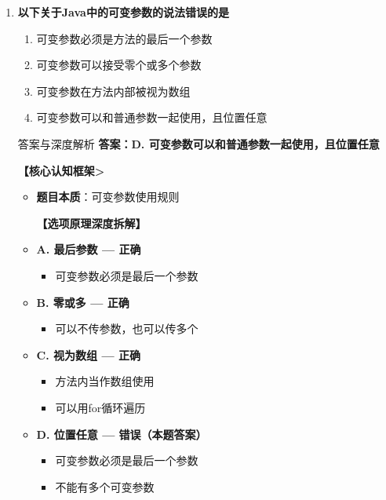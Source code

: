 \documentclass[12pt, a4paper]{ctexart}
\begin{document}
\begin{enumerate}[label=\textbf{\arabic*.}]
\begin{bluebox}{答案与深度解析}
	      \end{bluebox}

	      \vspace{1em}

	\item \textbf{以下关于Java中的可变参数的说法错误的是}
	      \begin{enumerate}[label=\Alph*.]
		      \item 可变参数必须是方法的最后一个参数
		      \item 可变参数可以接受零个或多个参数
		      \item 可变参数在方法内部被视为数组
		      \item 可变参数可以和普通参数一起使用，且位置任意
	      \end{enumerate}

	      \begin{bluebox}{答案与深度解析}
		      \textbf{答案：D. 可变参数可以和普通参数一起使用，且位置任意}

		      \textbf{【核心认知框架>}
		      \begin{itemize}[label={}, leftmargin=*, nosep]
			      \item \textbf{题目本质}：可变参数使用规则

		      \textbf{【选项原理深度拆解】}

		      \item \textbf{A. 最后参数 — 正确}
		      \begin{itemize}[label={}, nosep]
			      \item 可变参数必须是最后一个参数
		      \end{itemize}

		      \item \textbf{B. 零或多 — 正确}
		      \begin{itemize}[label={}, nosep]
			      \item 可以不传参数，也可以传多个
		      \end{itemize}

		      \item \textbf{C. 视为数组 — 正确}
		      \begin{itemize}[label={}, nosep]
			      \item 方法内当作数组使用
			      \item 可以用for循环遍历
		      \end{itemize}

		      \item \textbf{D. 位置任意 — 错误（本题答案）}
		      \begin{itemize}[label={}, nosep]
			      \item 可变参数必须是最后一个参数
			      \item 不能有多个可变参数
		      \end{itemize}


\end{itemize}
\end{bluebox}
\end{enumerate}
\end{document}
